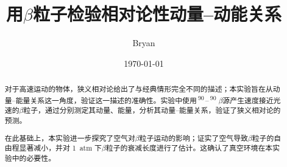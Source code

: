 \documentclass[aps,pre,12pt,preprint,%
	onecolumn,showpacs,showkeys,nofootinbib]{revtex4-1}
\newcommand{\SrAtom}{\,\textsuperscript{90}\tup{Sr}\,}
\newcommand{\Yatom}{\,\textsuperscript{90}\tup{Y}\,}
\begin{document}
	\title{%
	\texstringonly{\hfil\\[2\baselineskip]}
	\sf\LARGE%
		用\texorpdfstring{$\beta$}{β}粒子检验相对论性动量--动能关系%
	\texstringonly{\vspace{3ex}}}
	\author{\fangsong\large%
		Bryan%
	\vspace{2mm}}
	\date{\today}

\begin{abstract}
\vspace{10mm}
\begin{spacing}{1.5}\normalsize
\setlength{\parskip}{.3\baselineskip}
	对于高速运动的物体，狭义相对论给出了与经典情形完全不同的描述；本实验旨在从动量--能量关系这一角度，验证这一描述的准确性。实验中使用\SrAtom--\Yatom\,$\beta$源产生速度接近光速的$\beta$粒子，通过分别测定其动量、能量，分析其动量--能量关系，验证了狭义相对论的预测。
	
	在此基础上，本实验进一步探究了空气对$\beta$粒子运动的影响；证实了空气导致$\beta$粒子的自由程显著减小，并对 \SI{1}{atm} 下$\beta$粒子的衰减长度进行了估计。这确认了真空环境在本实验中的必要性。
\end{spacing}
\end{abstract}

\maketitle
\thispagestyle{titlepagestyle}

\end{document}

